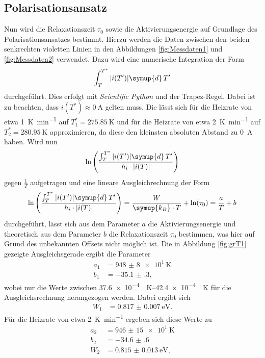 \subsection{Polarisationsansatz}
\label{sec:grT}
Nun wird die Relaxationszeit $\tau_0$ sowie die Aktivierungsenergie auf Grundlage des Polarisationsansatzes bestimmt.
Hierzu werden die Daten zwischen den beiden senkrechten violetten Linien in den Abbildungen \ref{fig:Messdaten1} und \ref{fig:Messdaten2} verwendet.
Dazu wird eine numerische Integration der Form
\begin{equation}
    \label{eqn:int}
    \int_T^{T^*} |i(T')| \symup{d}\,T'
\end{equation}
durchgeführt. Dies erfolgt mit \textit{Scientific Python} \cite{scipy} und der Trapez-Regel. Dabei ist zu beachten, dass $i(T^*) \approx \SI{0}{\ampere}$ gelten muss.
Die lässt sich für die Heizrate von etwa \SI{1}{\kelvin\per\minute} auf $T^*_1 = \SI{275.85}{\kelvin}$ und für die Heizrate von etwa \SI{2}{\kelvin\per\minute} 
auf $T^*_2 = \SI{280.95}{\kelvin}$ approximieren, da diese den kleinsten absoluten Abstand zu \SI{0}{\ampere} haben.
Wird nun
\begin{equation*}
    \ln\left(\frac{\int_T^{T^*} |i(T')| \symup{d}\,T'}{h_i \cdot |i(T)|}\right)
\end{equation*}
gegen $\frac{1}{T}$ aufgetragen und eine lineare Ausgleichrechnung der Form
\begin{equation}
    \label{eqn:lin2}
    \ln\left(\frac{\int_T^{T^*} |i(T')| \symup{d}\,T'}{h_i \cdot |i(T)|}\right) = \frac{W}{\symup{k_B} \cdot T} + \ln(\tau_0) = \frac{a}{T} + b
\end{equation}
durchgeführt, lässt sich aus dem Parameter $a$ die Aktivierungsenergie und theoretisch aus dem Parameter $b$ die Relaxationszeit $\tau_0$ bestimmen,
was hier auf Grund des unbekannten Offsets nicht möglich ist.
Die in Abbildung \ref{fig:grT1} gezeigte Ausgleichsgerade ergibt die Parameter
\begin{align*}
    a_1 &= \SI{948(8)e1}{\kelvin} \\
    b_1 &= \num{-35.1(3)},
\end{align*}
wobei nur die Werte zwischen \SIrange{37.6e-4}{42.4e-4}{\per\kelvin} für die Ausgleichsrechnung herangezogen werden. Dabei ergibt sich
\begin{align*}
    W_1 &= \SI{0.817(7)}{\electronvolt}.
\end{align*}
Für die Heizrate von etwa \SI{2}{\kelvin\per\minute} ergeben sich diese Werte zu
\begin{align*}
    a_2 &= \SI{946(15)e1}{\kelvin} \\
    b_2 &= \num{-34.6(6)} \\
    W_2 &= \SI{0.815(13)}{\electronvolt},
\end{align*}

